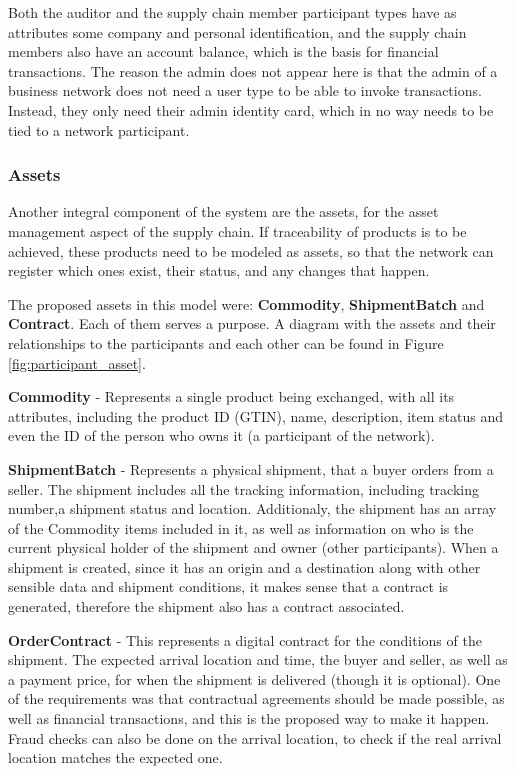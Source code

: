 Both the auditor and the supply chain member participant types have as attributes some company and personal identification, and the supply chain members also have an account balance, which is the basis for financial transactions.  The reason the admin does not appear here is that the admin of a business network does not need a user type to be able to invoke transactions. Instead, they only need their admin identity card, which in no way needs to be tied to a network participant.

\subsubsection*{Assets}%

Another integral component of the system are the assets, for the asset management aspect of the supply chain. If traceability of products is to be achieved, these products need to be modeled as assets, so that the network can register which ones exist, their status, and any changes that happen.

The proposed assets in this model were: \textbf{Commodity}, \textbf{ShipmentBatch} and \textbf{Contract}. Each of them serves a purpose. A diagram with the assets and their relationships to the participants and each other can be found in Figure \ref{fig:participant_asset}.

\par \textbf{Commodity} - Represents a single product being exchanged, with all its attributes, including the product ID (GTIN), name, description, item status and even the ID of the person who owns it (a participant of the network).
\par \textbf{ShipmentBatch} - Represents a physical shipment, that a buyer orders from a seller. The shipment includes all the tracking information, including tracking number,a shipment status and location. Additionaly, the shipment  has an array of the Commodity items included in it, as well as information on who is the current physical holder of the shipment and owner (other participants). When a shipment is created, since it has an origin and a destination along with other sensible data and shipment conditions, it makes sense that a contract is generated, therefore the shipment also has a contract associated.
\par \textbf{OrderContract} - This represents a digital contract for the conditions of the shipment. The expected arrival location and time, the buyer and seller, as well as a payment price, for when the shipment is delivered (though it is optional). One of the requirements was that contractual agreements should be made possible, as well as financial transactions, and this is the proposed way to make it happen. Fraud checks can also be done on the arrival location, to check if the real arrival location matches the expected one.

